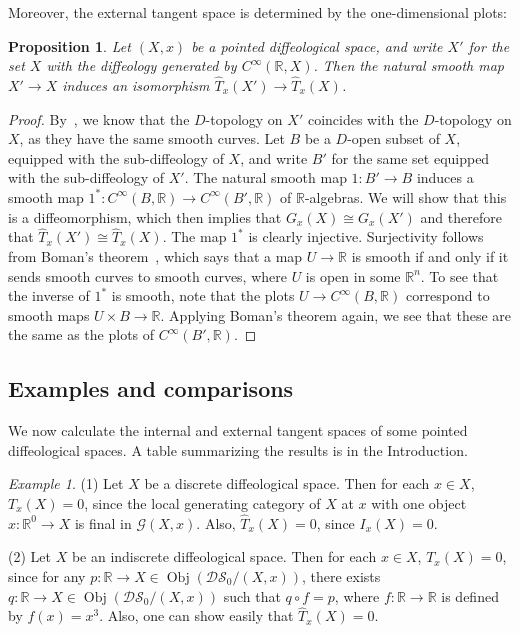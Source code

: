 \documentclass{amsart}
\newtheorem{prop}[de]{Proposition}
\theoremstyle{remark}
\newtheorem{ex}[de]{Example}
\newcommand{\ra}{\to}
\DeclareMathOperator{\obj}{Obj}
\newcommand{\DS}{{\mathcal{DS}}}
\newcommand{\cG}{{\mathcal{G}}}
\def \R{\mathbb{R}}
\begin{document}
Moreover, the external tangent space is determined by the one-dimensional plots:

\begin{prop}\label{prop:1-plots-determine-external}
Let $(X,x)$ be a pointed diffeological space,
and write $X'$ for the set $X$ with the diffeology generated by $C^\infty(\R,X)$.
Then the natural smooth map $X' \ra X$ induces an isomorphism $\hat{T}_x(X') \ra \hat{T}_x(X)$.
\end{prop}

\begin{proof}
By~\cite[Theorem~3.7]{CSW}, we know that the $D$-topology on $X'$ coincides with the $D$-topology
on $X$, as they have the same smooth curves. Let $B$ be a $D$-open subset of $X$, equipped 
with the sub-diffeology of $X$, and write $B'$ for the same set equipped with the sub-diffeology 
of $X'$.
The natural smooth map $1:B' \ra B$ induces a smooth map 
$1^*: C^\infty(B,\R) \ra C^\infty(B',\R)$ of $\R$-algebras.
We will show that this is a diffeomorphism, which then implies that $G_x(X) \cong G_x(X')$
and therefore that $\hat{T}_x(X') \cong \hat{T}_x(X)$.
The map $1^*$ is clearly injective.
Surjectivity follows from Boman's theorem~\cite[Corollary~3.14]{KM},
which says that a map $U \to \R$ is smooth if and only if it sends smooth curves to smooth curves,
where $U$ is open in some $\R^n$.
To see that the inverse of $1^*$ is smooth, note that the plots
$U \to C^{\infty}(B, \R)$ correspond to smooth maps $U \times B \to \R$.
Applying Boman's theorem again, we see that these are the same as the
plots of $C^{\infty}(B', \R)$.
\end{proof}


%
%
%
%
%
%
%
%
%
%
%
%
%
%
%
%
%
%
%
%
%
%
%
%
%




%
%
%
%
%
%
%
%
%
%
%
%
%
%
%
%
%
%
%
%
%
%
%
%


\subsection{Examples and comparisons}\label{ss:examples}

We now calculate the internal and external tangent spaces of
some pointed diffeological spaces.
A table summarizing the results is in the Introduction.

\begin{ex}\label{(in)dis}
(1) Let $X$ be a discrete diffeological space.
Then for each $x \in X$,
$T_x(X)=0$, since the local generating category of $X$ at $x$
with one object $x:\R^0 \ra X$ is final in $\cG(X,x)$.
Also, $\hat{T}_x(X)=0$, since $I_x(X)=0$.

(2) Let $X$ be an indiscrete diffeological space.
Then for each $x \in X$, $T_x(X)=0$, since for any $p:\R \ra X \in \obj(\DS_0/(X,x))$,
there exists $q:\R \ra X \in \obj(\DS_0/(X,x))$ such that $q \circ f=p$,
where $f:\R \ra \R$ is defined by $f(x)=x^3$.
Also, one can show easily that $\hat{T}_x(X)=0$.
\end{ex}
\end{document}
